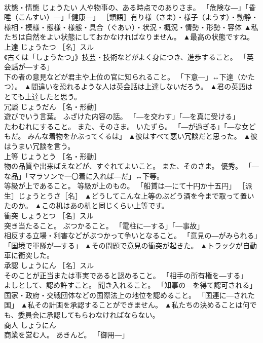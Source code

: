 \documentclass[8pt]{extreport}
\begin{document}
\begin{CJK}{UTF8}{min}
\\	状態・情態	じょうたい	人や物事の、ある時点でのありさま。 「危険な―」「昏睡（こんすい）―」「健康―」 ［類語］有り様（さま）・様子（ようす）・動静・様相・模様・態様・様態・具合（ぐあい）・状況・概況・情勢・形勢・容体	▲私たちは自然をよい状態にしておかなければなりません。 ▲最高の状態ですね。
\\	上達	じょうたつ	［名］スル 
\\	《古くは「しょうたつ」》技芸・技術などがよく身につき、進歩すること。 「英会話が―する」 
\\	下の者の意見などが君主や上位の官に知られること。 「下意―」↔下達（かたつ）。	▲間違いを恐れるような人は英会話は上達しないだろう。 ▲君の英語はとても上達したと思う。
\\	冗談	じょうだん	［名・形動］ 
\\	遊びでいう言葉。 ふざけた内容の話。 「―を交わす」「―を真に受ける」 
\\	たわむれにすること。 また、そのさま。 いたずら。 「―が過ぎる」「―な女どもだ。 みんな着物をかぶってくるは」	▲彼はすべて悪い冗談だと思った。 ▲彼はうまい冗談を言う。
\\	上等	じょうとう	［名・形動］ 
\\	物の品質や出来ばえなどが、すぐれてよいこと。 また、そのさま。 優秀。 「―な品」「マラソンで一〇着に入れば―だ」↔下等。 
\\	等級が上であること。 等級が上のもの。 「船賃は―にて十円か十五円」 ［派生］じょうとうさ［名］	▲どうしてこんな上等のぶどう酒を今まで取って置いたのか。 ▲この机はあの机と同じくらい上等です。
\\	衝突	しょうとつ	［名］スル 
\\	突き当たること。 ぶつかること。 「電柱に―する」「―事故」 
\\	相反する立場・利害などがぶつかって争いとなること。 「意見の―がみられる」「国境で軍隊が―する」	▲その問題で意見の衝突が起きた。 ▲トラックが自動車に衝突した。
\\	承認	しょうにん	［名］スル 
\\	そのことが正当または事実であると認めること。 「相手の所有権を―する」 
\\	よしとして、認め許すこと。 聞き入れること。 「知事の―を得て認可される」 
\\	国家・政府・交戦団体などの国際法上の地位を認めること。 「国連に―された国」	▲私その計画を承認することができません。 ▲私たちの決めることは何でも、委員会に承認してもらわなければならない。
\\	商人	しょうにん	
\\	商業を営む人。 あきんど。 「御用―」 

\end{CJK}
\end{document}
